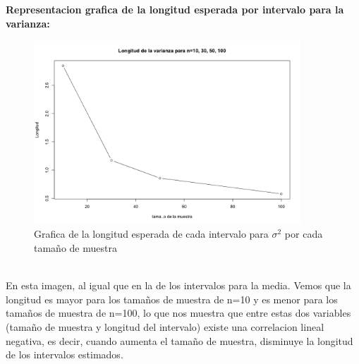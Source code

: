 \documentclass[letterpaper,12pt,onecolumn,titlepage]{article}
\begin{document}
\pagebreak\textbf{Representacion grafica de la longitud esperada por intervalo para la varianza:}
~\\ \begin{figure}[!h]
    \begin{center}
        \includegraphics[width=10cm]{Figuras/Pb2.png}
        \caption{Grafica de la longitud esperada de cada intervalo para $\sigma^2$ por cada tama\~{n}o de muestra}
        \label{fig:Densidad}
    \end{center}
\end{figure}
~\\ En esta imagen, al igual que en la de los intervalos para la media. Vemos que la longitud es mayor para los tama\~{n}os de muestra de n=10 y es menor para los tama\~{n}os de muestra de n=100, lo que nos muestra que entre estas dos variables (tama\~{n}o de muestra y longitud del intervalo) existe una correlacion lineal negativa, es decir, cuando aumenta el tama\~{n}o de muestra, disminuye la longitud de los intervalos estimados.
\end{document}
